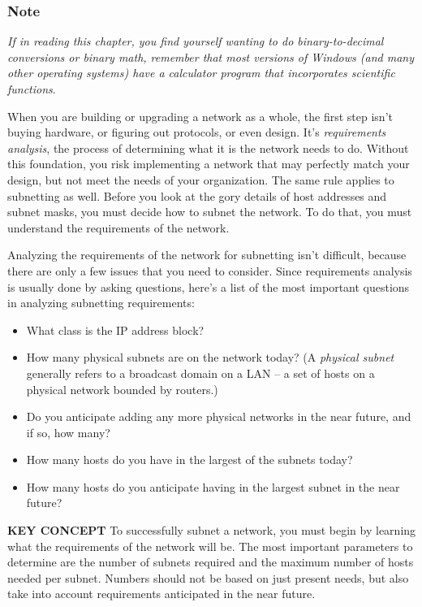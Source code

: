 \subsubsection[Note]{\texorpdfstring{\protect\hypertarget{ch19.htmlux5cux23note-77}{}{}Note}{Note}}

{\emph{If in reading this chapter, you find yourself wanting to do
binary-to-decimal conversions or binary math, remember that most
versions of Windows (and many other operating systems) have a calculator
program that incorporates scientific functions}}.

When you are building or upgrading a network as a whole, the first step
isn't buying hardware, or figuring out protocols, or even design. It's
{\emph{requirements analysis}}, the process of determining what it is
the network needs to do. Without this foundation, you risk implementing
a network that may perfectly match your design, but not meet the needs
of your organization. The same rule applies to subnetting as well.
Before you look at the gory details of host addresses and subnet masks,
you must decide how to subnet the network. To do that, you must
understand the requirements of the network.

Analyzing the requirements of the network for subnetting isn't
difficult, because there are only a few issues that you need to
consider. Since requirements analysis is usually done by asking
questions, here's a list of the most important questions in analyzing
subnetting requirements:

\begin{itemize}
\item
  What class is the IP address block?
\item
  How many physical subnets are on the network today? (A {\emph{physical
  subnet}} generally refers to a broadcast domain on a LAN -- a set of
  hosts on a physical network bounded by routers.)
\item
  Do you anticipate adding any more physical networks in the near
  future, and if so, how many?
\item
  How many hosts do you have in the largest of the subnets today?
\item
  How many hosts do you anticipate having in the largest subnet in the
  near future?
\end{itemize}


{\textbf{KEY CONCEPT}} To successfully subnet a network, you must begin
by learning what the requirements of the network will be. The most
important parameters to determine are the number of subnets required and
the maximum number of hosts needed per subnet. Numbers should not be
based on just present needs, but also take into account requirements
anticipated in the near future.

